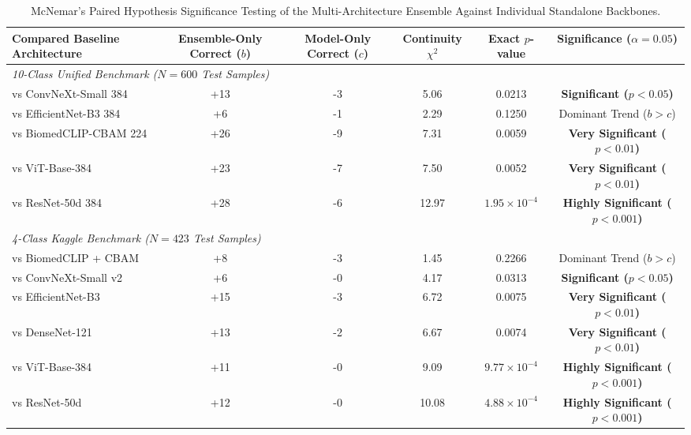 \begin{table}[t]
\centering
\caption{McNemar's Paired Hypothesis Significance Testing of the Multi-Architecture Ensemble Against Individual Standalone Backbones.}
\label{tab:mcnemar_significance}
\small
\begin{tabular}{lccccc}
\hline
\textbf{Compared Baseline Architecture} & \textbf{Ensemble-Only Correct ($b$)} & \textbf{Model-Only Correct ($c$)} & \textbf{Continuity $\chi^2$} & \textbf{Exact $p$-value} & \textbf{Significance ($\alpha=0.05$)} \\
\hline
\multicolumn{6}{l}{\textit{10-Class Unified Benchmark ($N=600$ Test Samples)}} \\
vs ConvNeXt-Small 384 & +13 & -3 & 5.06 & 0.0213 & \textbf{Significant ($p < 0.05$)} \\
vs EfficientNet-B3 384 & +6 & -1 & 2.29 & 0.1250 & Dominant Trend ($b > c$) \\
vs BiomedCLIP-CBAM 224 & +26 & -9 & 7.31 & 0.0059 & \textbf{Very Significant ($p < 0.01$)} \\
vs ViT-Base-384 & +23 & -7 & 7.50 & 0.0052 & \textbf{Very Significant ($p < 0.01$)} \\
vs ResNet-50d 384 & +28 & -6 & 12.97 & $1.95 \times 10^{-4}$ & \textbf{Highly Significant ($p < 0.001$)} \\
\hline
\multicolumn{6}{l}{\textit{4-Class Kaggle Benchmark ($N=423$ Test Samples)}} \\
vs BiomedCLIP + CBAM & +8 & -3 & 1.45 & 0.2266 & Dominant Trend ($b > c$) \\
vs ConvNeXt-Small v2 & +6 & -0 & 4.17 & 0.0313 & \textbf{Significant ($p < 0.05$)} \\
vs EfficientNet-B3 & +15 & -3 & 6.72 & 0.0075 & \textbf{Very Significant ($p < 0.01$)} \\
vs DenseNet-121 & +13 & -2 & 6.67 & 0.0074 & \textbf{Very Significant ($p < 0.01$)} \\
vs ViT-Base-384 & +11 & -0 & 9.09 & $9.77 \times 10^{-4}$ & \textbf{Highly Significant ($p < 0.001$)} \\
vs ResNet-50d & +12 & -0 & 10.08 & $4.88 \times 10^{-4}$ & \textbf{Highly Significant ($p < 0.001$)} \\
\hline
\end{tabular}
\end{table}
